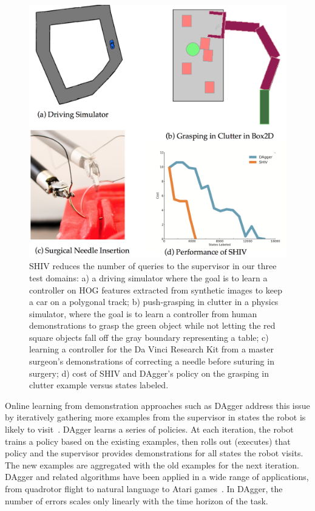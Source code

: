 \documentclass[10pt, conference]{ieeeconf}      %
\begin{document}
\begin{figure}[t!]
\centering
\includegraphics[width=\columnwidth]{figures/teaser.pdf}
\caption{ 
SHIV  reduces the number of queries to the supervisor in our three test domains: a) a driving simulator where the goal is to learn a controller on HOG features extracted from synthetic images to keep a car on a polygonal track; b) push-grasping in clutter in a physics simulator, where the goal is to learn a controller from human demonstrations to grasp the green object while not letting the red square objects fall off the gray boundary representing a table; c) learning a controller for the Da Vinci Research Kit from a master surgeon's demonstrations of correcting a needle before suturing in surgery; d) cost of SHIV and DAgger's policy on the grasping in clutter example versus states labeled.
}
\vspace*{-10pt}
\label{fig:teaser}
\end{figure}


Online learning from demonstration approaches such as DAgger address this issue by iteratively gathering more examples from the supervisor in states the robot is likely to visit~\cite{grollman2007dogged,ross2010efficient,ross2010reduction}. DAgger learns a series of policies. At each iteration, the robot trains a policy based on the existing examples, then rolls out (executes) that policy and the supervisor provides demonstrations for all states the robot visits. The new examples are aggregated with the old examples for the next iteration. DAgger and related algorithms have been applied in a wide range of applications, from quadrotor flight to natural language to Atari games~\cite{NIPS2014_5421,duvallet2013imitation,ross2013learning}. In DAgger, the number of errors scales only linearly with the time horizon of the task.
\end{document}
